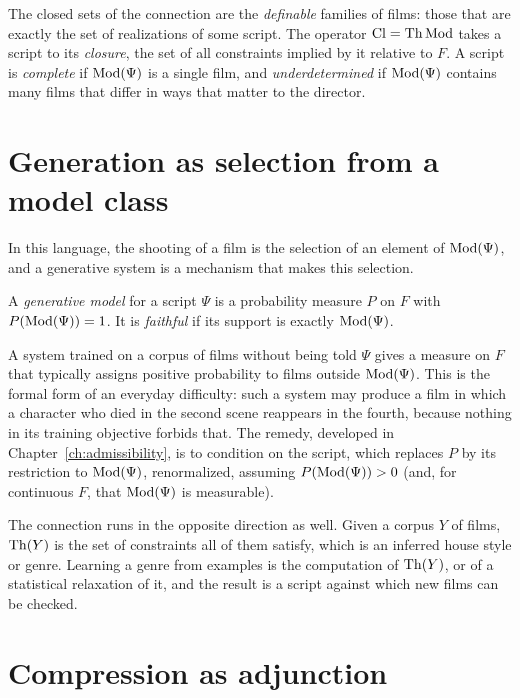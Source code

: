 The closed sets of the connection are the \emph{definable} families of films: those that are exactly the set of realizations of some script. The operator $\operatorname{Cl}=\operatorname{Th}\operatorname{Mod}$ takes a script to its \emph{closure}, the set of all constraints implied by it relative to $F$. A script is \emph{complete} if $\operatorname{Mod}(\Psi)$ is a single film, and \emph{underdetermined} if $\operatorname{Mod}(\Psi)$ contains many films that differ in ways that matter to the director.

\section{Generation as selection from a model class}

In this language, the shooting of a film is the selection of an element of $\operatorname{Mod}(\Psi)$, and a generative system is a mechanism that makes this selection.

\begin{definition}
A \emph{generative model} for a script $\Psi$ is a probability measure $P$ on $F$ with $P(\operatorname{Mod}(\Psi))=1$. It is \emph{faithful} if its support is exactly $\operatorname{Mod}(\Psi)$.
\end{definition}

A system trained on a corpus of films without being told $\Psi$ gives a measure on $F$ that typically assigns positive probability to films outside $\operatorname{Mod}(\Psi)$. This is the formal form of an everyday difficulty: such a system may produce a film in which a character who died in the second scene reappears in the fourth, because nothing in its training objective forbids that. The remedy, developed in Chapter~\ref{ch:admissibility}, is to condition on the script, which replaces $P$ by its restriction to $\operatorname{Mod}(\Psi)$, renormalized, assuming $P(\operatorname{Mod}(\Psi))>0$ (and, for continuous $F$, that $\operatorname{Mod}(\Psi)$ is measurable).

\begin{remark}
The connection runs in the opposite direction as well. Given a corpus $Y$ of films, $\operatorname{Th}(Y)$ is the set of constraints all of them satisfy, which is an inferred house style or genre. Learning a genre from examples is the computation of $\operatorname{Th}(Y)$, or of a statistical relaxation of it, and the result is a script against which new films can be checked.
\end{remark}

\section{Compression as adjunction}

